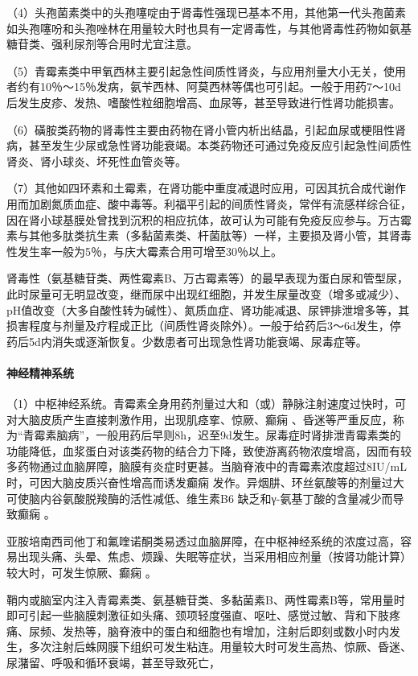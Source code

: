 （4）头孢菌素类中的头孢噻啶由于肾毒性强现已基本不用，其他第一代头孢菌素如头孢噻吩和头孢唑林在用量较大时也具有一定肾毒性，与其他肾毒性药物如氨基糖苷类、强利尿剂等合用时尤宜注意。

（5）青霉素类中甲氧西林主要引起急性间质性肾炎，与应用剂量大小无关，使用者约有10％～15％发病，氨苄西林、阿莫西林等偶也可引起。一般于用药7～10d后发生皮疹、发热、嗜酸性粒细胞增高、血尿等，甚至导致进行性肾功能损害。

（6）磺胺类药物的肾毒性主要由药物在肾小管内析出结晶，引起血尿或梗阻性肾病，甚至发生少尿或急性肾功能衰竭。本类药物还可通过免疫反应引起急性间质性肾炎、肾小球炎、坏死性血管炎等。

（7）其他如四环素和土霉素，在肾功能中重度减退时应用，可因其抗合成代谢作用而加剧氮质血症、酸中毒等。利福平引起的间质性肾炎，常伴有流感样综合征，因在肾小球基膜处曾找到沉积的相应抗体，故可认为可能有免疫反应参与。万古霉素与其他多肽类抗生素（多黏菌素类、杆菌肽等）一样，主要损及肾小管，其肾毒性发生率一般为5％，与庆大霉素合用可增至30％以上。

肾毒性（氨基糖苷类、两性霉素B、万古霉素等）的最早表现为蛋白尿和管型尿，此时尿量可无明显改变，继而尿中出现红细胞，并发生尿量改变（增多或减少）、pH值改变（大多自酸性转为碱性）、氮质血症、肾功能减退、尿钾排泄增多等，其损害程度与剂量及疗程成正比（间质性肾炎除外）。一般于给药后3～6d发生，停药后5d内消失或逐渐恢复。少数患者可出现急性肾功能衰竭、尿毒症等。
\paragraph{神经精神系统}

（1）中枢神经系统。青霉素全身用药剂量过大和（或）静脉注射速度过快时，可对大脑皮质产生直接刺激作用，出现肌痉挛、惊厥、癫痫
、昏迷等严重反应，称为“青霉素脑病”，一般用药后早则8h，迟至9d发生。尿毒症时肾排泄青霉素类的功能降低，血浆蛋白对该类药物的结合力下降，致使游离药物浓度增高，因而有较多药物通过血脑屏障，脑膜有炎症时更甚。当脑脊液中的青霉素浓度超过8IU/mL时，可因大脑皮质兴奋性增高而诱发癫痫
发作。异烟肼、环丝氨酸等的剂量过大可使脑内谷氨酸脱羧酶的活性减低、维生素B{6}
缺乏和γ-氨基丁酸的含量减少而导致癫痫
。

亚胺培南西司他丁和氟喹诺酮类易透过血脑屏障，在中枢神经系统的浓度过高，容易出现头痛、头晕、焦虑、烦躁、失眠等症状，当采用相应剂量（按肾功能计算）较大时，可发生惊厥、癫痫
。

鞘内或脑室内注入青霉素类、氨基糖苷类、多黏菌素B、两性霉素B等，常用量时即可引起一些脑膜刺激征如头痛、颈项轻度强直、呕吐、感觉过敏、背和下肢疼痛、尿频、发热等，脑脊液中的蛋白和细胞也有增加，注射后即刻或数小时内发生，多次注射后蛛网膜下组织可发生粘连。用量较大时可发生高热、惊厥、昏迷、尿潴留、呼吸和循环衰竭，甚至导致死亡，


